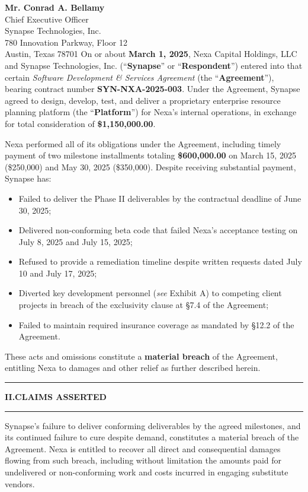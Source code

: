 \documentclass[
  paper=letter,
  fontsize=10.5pt,
  parskip=half,
  firsthead=true,
  fromalign=right,
  fromrule=false,
  addrfield=topaligned,
  subject=titled,
  foldmarks=false
]{scrlttr2}
\newcommand{\sectionrule}{%
  \par\vspace{2pt}%
  {\color{GoldAccent}\rule{\linewidth}{0.8pt}}%
  \par\vspace{4pt}%
}
\begin{document}
\begin{letter}{%
  \textbf{Mr. Conrad A. Bellamy}\\
  Chief Executive Officer\\
  Synapse Technologies, Inc.\\
  780 Innovation Parkway, Floor 12\\
  Austin, Texas 78701%
}
On or about \textbf{March 1, 2025}, Nexa Capital Holdings, LLC and Synapse Technologies, Inc. (\textquotedblleft\textbf{Synapse}\textquotedblright{} or \textquotedblleft\textbf{Respondent}\textquotedblright) entered into that certain \textit{Software Development \& Services Agreement} (the \textquotedblleft\textbf{Agreement}\textquotedblright), bearing contract number \textbf{SYN-NXA-2025-003}. Under the Agreement, Synapse agreed to design, develop, test, and deliver a proprietary enterprise resource planning platform (the \textquotedblleft\textbf{Platform}\textquotedblright) for Nexa's internal operations, in exchange for total consideration of \textbf{\$1,150,000.00}.

Nexa performed all of its obligations under the Agreement, including timely payment of two milestone installments totaling \textbf{\$600,000.00} on March 15, 2025 (\$250,000) and May 30, 2025 (\$350,000). Despite receiving substantial payment, Synapse has:

\begin{itemize}[leftmargin=1.5em, itemsep=3pt, topsep=4pt]
  \item Failed to deliver the Phase II deliverables by the contractual deadline of June 30, 2025;
  \item Delivered non-conforming beta code that failed Nexa's acceptance testing on July 8, 2025 and July 15, 2025;
  \item Refused to provide a remediation timeline despite written requests dated July 10 and July 17, 2025;
  \item Diverted key development personnel (\textit{see} Exhibit A) to competing client projects in breach of the exclusivity clause at \S 7.4 of the Agreement;
  \item Failed to maintain required insurance coverage as mandated by \S 12.2 of the Agreement.
\end{itemize}

These acts and omissions constitute a \textbf{material breach} of the Agreement, entitling Nexa to damages and other relief as further described herein.

\vspace{4pt}
\sectionrule
{\sffamily\bfseries\color{NavyDeep}\normalsize II.\enspace CLAIMS ASSERTED}
\sectionrule

\begin{tcolorbox}[demandstyle={Claim 1 \ \ Breach of Contract}]
\noindent Synapse's failure to deliver conforming deliverables by the agreed milestones, and its continued failure to cure despite demand, constitutes a material breach of the Agreement. Nexa is entitled to recover all direct and consequential damages flowing from such breach, including without limitation the amounts paid for undelivered or non-conforming work and costs incurred in engaging substitute vendors.


\end{tcolorbox}
\end{letter}
\end{document}

